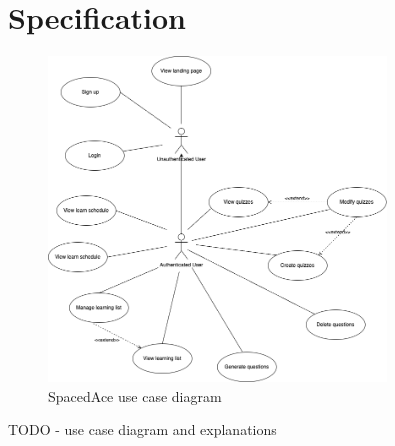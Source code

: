 \chapter{Specification}

\begin{figure}[H]
    \centering
    \includegraphics[width=0.8\textwidth, keepaspectratio]{figures/use-case.png}
    \caption{SpacedAce use case diagram}
    \label{fig:use-case}
\end{figure}

TODO - use case diagram and explanations